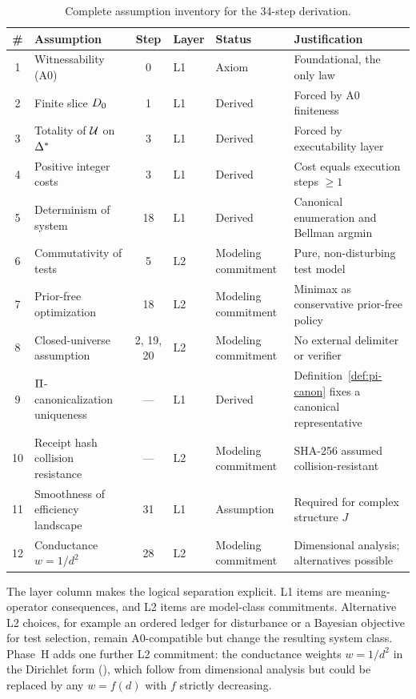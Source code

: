 \begin{table}[ht]
\centering
\footnotesize
\caption{Complete assumption inventory for the 34-step derivation.}
\label{tab:assumptions}
\begin{tabular}{@{}clcllp{3.8cm}@{}}
\toprule
\textbf{\#} & \textbf{Assumption} & \textbf{Step} & \textbf{Layer} & \textbf{Status} & \textbf{Justification} \\
\midrule
1 & Witnessability (A0) & 0 & L1 & Axiom & Foundational, the only law \\
2 & Finite slice $D_0$ & 1 & L1 & Derived & Forced by A0 finiteness \\
3 & Totality of $\mathcal{U}$ on $\Delta^*$ & 3 & L1 & Derived & Forced by executability layer \\
4 & Positive integer costs & 3 & L1 & Derived & Cost equals execution steps $\geq 1$ \\
5 & Determinism of system & 18 & L1 & Derived & Canonical enumeration and Bellman argmin \\
6 & Commutativity of tests & 5 & L2 & Modeling commitment & Pure, non-disturbing test model \\
7 & Prior-free optimization & 18 & L2 & Modeling commitment & Minimax as conservative prior-free policy \\
8 & Closed-universe assumption & 2, 19, 20 & L2 & Modeling commitment & No external delimiter or verifier \\
9 & $\Pi$-canonicalization uniqueness & --- & L1 & Derived & Definition~\ref{def:pi-canon} fixes a canonical representative \\
10 & Receipt hash collision resistance & --- & L2 & Modeling commitment & SHA-256 assumed collision-resistant \\
11 & Smoothness of efficiency landscape & 31 & L1 & Assumption & Required for complex structure $J$ \\
12 & Conductance $w = 1/d^2$ & 28 & L2 & Modeling commitment & Dimensional analysis; alternatives possible \\
\bottomrule
\end{tabular}
\end{table}

\noindent
The layer column makes the logical separation explicit.  L1 items are
meaning-operator consequences, and L2 items are model-class commitments.
Alternative L2 choices, for example an ordered ledger for disturbance or a
Bayesian objective for test selection, remain A0-compatible but change the
resulting system class.  Phase~H adds one further L2 commitment: the
conductance weights $w = 1/d^2$ in the Dirichlet form (), which
follow from dimensional analysis but could be replaced by any
$w = f(d)$ with $f$ strictly decreasing.

